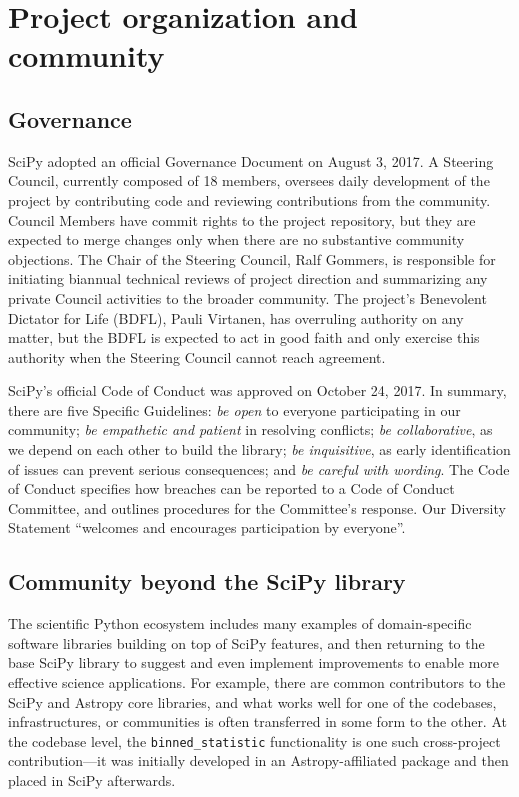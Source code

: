 \documentclass[fleqn,10pt]{wlscirep}
\begin{document}

\section*{Project organization and community}

\subsection*{Governance}

SciPy adopted an official Governance Document on August 3, 2017\cite{SciPyProjectGovernance}. A Steering Council, currently composed of 18 members, oversees daily development of the project by contributing code and reviewing contributions from the community. Council Members have commit rights to the project repository, but they are expected to merge changes only when there are no substantive community objections. The Chair of the Steering Council, Ralf Gommers, is responsible for initiating biannual technical reviews of project direction and summarizing any private Council activities to the broader community. The project's Benevolent Dictator for Life (BDFL), Pauli Virtanen, has overruling authority on any matter, but the BDFL is expected to act in good faith and only exercise this authority when the Steering Council cannot reach agreement.

SciPy's official Code of Conduct was approved on October 24, 2017. In summary, there are five Specific Guidelines:
\emph{be open} to everyone participating in our community;
\emph{be empathetic and patient} in resolving conflicts;
\emph{be collaborative}, as we depend on each other to build the library;
\emph{be inquisitive}, as early identification of issues can prevent serious consequences; and
\emph{be careful with wording}.
The Code of Conduct specifies how breaches can be reported to a Code of Conduct Committee, and outlines procedures for the Committee's response. Our Diversity Statement ``welcomes and encourages participation by everyone''.


\subsection*{Community beyond the SciPy library}

The scientific Python ecosystem includes many examples
of domain-specific software libraries building on top
of SciPy features, and then returning to the base SciPy library
to suggest and even implement improvements to enable
more effective science applications. For example, there
are common contributors to the SciPy and Astropy core
libraries\cite{astropy-2018}, and what works well for 
one of the codebases, infrastructures, or communities 
is often transferred in some form to the other. At the codebase 
level, the \texttt{binned\_statistic} functionality
is one such cross-project contribution---it was initially
developed in an Astropy-affiliated package
and then placed in SciPy afterwards.
\end{document}
